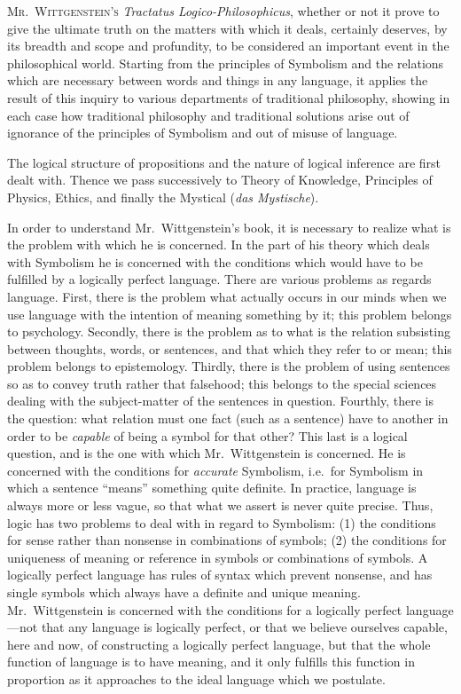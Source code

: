 \textsc{Mr.\ Wittgenstein’s} \emph{Tractatus Logico\hyp{}Philosophicus}, whether or not it prove to give the ultimate truth on the matters with which it deals, certainly deserves, by its breadth and scope and profundity, to be considered an important event in the philosophical world. Starting from the principles of Symbolism and the relations which are necessary between words and things in any language, it applies the result of this inquiry to various departments of traditional philosophy, showing in each case how traditional philosophy and traditional solutions arise out of ignorance of the principles of Symbolism and out of misuse of language.

The logical structure of propositions and the nature of logical inference are first dealt with. Thence we pass successively to Theory of Knowledge, Principles of Physics, Ethics, and finally the Mystical (\emph{das Mystische}).

In order to understand Mr.\ Wittgenstein’s book, it is necessary to realize what is the problem with which he is concerned. In the part of his theory which deals with Symbolism he is concerned with the conditions which would have to be fulfilled by a logically perfect language. There are various problems as regards language. First, there is the problem what actually occurs in our minds when we use language with the intention of meaning something by it; this problem belongs to psychology. Secondly, there is the problem as to what is the relation subsisting between thoughts, words, or sentences, and that which they refer to or mean; this problem belongs to epistemology. Thirdly, there is the problem of using sentences so as to convey truth rather that falsehood; this belongs to the special sciences dealing with the subject-matter of the sentences in question. Fourthly, there is the question: what relation must one fact (such as a sentence) have to another in order to be \emph{capable} of being a symbol for that other? This last is a logical question, and is the one with which Mr.\ Wittgenstein is concerned. He is concerned with the conditions for \emph{accurate} Symbolism, i.e.\ for Symbolism in which a sentence “means” something quite definite. In practice, language is always more or less vague, so that what we assert is never quite precise. Thus, logic has two problems to deal with in regard to Symbolism: (1) the conditions for sense rather than nonsense in combinations of symbols; (2) the conditions for uniqueness of meaning or reference in symbols or combinations of symbols. A logically perfect language has rules of syntax which prevent nonsense, and has single symbols which always have a definite and unique meaning. Mr.\ Wittgenstein is concerned with the conditions for a logically perfect language—not that any language is logically perfect, or that we believe ourselves capable, here and now, of constructing a logically perfect language, but that the whole function of language is to have meaning, and it only fulfills this function in proportion as it approaches to the ideal language which we postulate.

